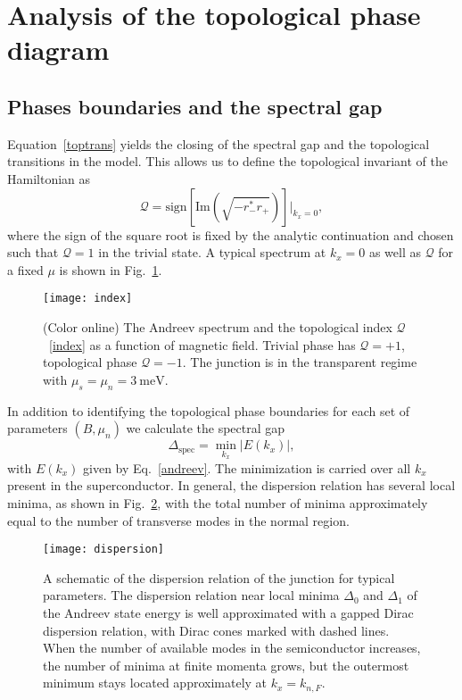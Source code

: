 \documentclass[twocolumn, notitlepage, 10pt, aps, floatfix, showpacs, prb, citeautoscript]{revtex4-1}
\newcommand{\comment}[1]{}
\begin{document}
\section{Analysis of the topological phase diagram}
\label{sec:topphases}

\subsection{Phases boundaries and the spectral gap}
\label{sec:phas-bound-spectr}

\comment{We compute topological invariant of this model}
Equation~\eqref{toptrans} yields the closing of the spectral gap and the topological transitions in the model.
This allows us to define the topological invariant of the Hamiltonian as
\begin{equation}\label{index}
\mathcal Q=\mathrm{sign}[\mathrm{Im}(\sqrt{-r_-^*r_+})]|_{k_x=0},
\end{equation}
where the sign of the square root is fixed by the analytic continuation and chosen such that $\mathcal Q=1$ in the trivial state.
A typical spectrum at $k_x = 0$ as well as $\mathcal Q$ for a fixed $\mu$ is shown in Fig.~\ref{fig:index}.

\begin{figure}
\texttt{[image: index]}
\caption{(Color online) The Andreev spectrum and the topological index $\mathcal Q$~\eqref{index} as a function of magnetic field.
Trivial phase has $\mathcal{Q}=+1$, topological phase $\mathcal{Q}=-1$.
The junction is in the transparent regime with $\mu_s=\mu_n=\SI{3}{\meV}$.}
\label{fig:index}
\end{figure}

\comment{We calculate the phase diagram from the spectrum}
In addition to identifying the topological phase boundaries for each set of parameters $(B, \mu_n)$ we calculate the spectral gap
\begin{equation}\label{specgap}
\Delta_\mathrm{spec}=\min_{k_x}|E(k_x)|,
\end{equation}
with $E(k_x)$ given by Eq.~\eqref{andreev}. The minimization is carried over all $k_x$ present in the superconductor.
In general, the dispersion relation has several local minima, as shown in Fig.~\ref{fig:dispersion}, with the total number of minima approximately equal to the number of transverse modes in the normal region.

\begin{figure}[tb]
\centering
\texttt{[image: dispersion]}
\caption{A schematic of the dispersion relation of the junction for typical parameters.
The dispersion relation near local minima $\Delta_0$ and $\Delta_1$ of the Andreev state energy is well approximated with a gapped Dirac dispersion relation, with Dirac cones marked with dashed lines.
When the number of available modes in the semiconductor increases, the number of minima at finite momenta grows, but the outermost minimum stays located approximately at $k_x = k_{n,F}$.}
\label{fig:dispersion}
\end{figure}
\end{document}
